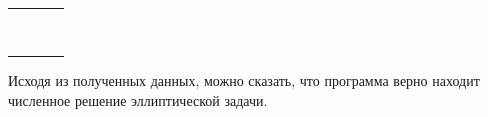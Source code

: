 \begin{table}
\begin{tabularx}{1.0\textwidth}{| >{\raggedright\arraybackslash}X | >{\raggedright\arraybackslash}X | >{\raggedright\arraybackslash}X |>{\raggedright\arraybackslash}X |}
		\centering{($2.0; y; 2.0; 3.0$)} & \centering{1.60000000E+001}& \centering{0.00000000E+000} & \centering{0.00000000E+000} \tabularnewline 
		
		
		
		\centering{($1.0; 1.0; z; 3.0$)} & \centering{1.00000000E+000}& \centering{0.00000000E+000} & \centering{0.00000000E+000} \tabularnewline 
		
		\centering{($2.0; 2.0; z; 3.0$)} & \centering{1.60000000E+001}& \centering{0.00000000E+000} & \centering{0.00000000E+000} \tabularnewline \hline
		
		\centering{($x; 1.0; 1.0; 4.0$)} & \centering{1.00000000E+000}& \centering{0.00000000E+000} & \centering{0.00000000E+000} \tabularnewline 
		
		\centering{($x; 2.0; 2.0; 4.0$)} & \centering{1.60000000E+001}& \centering{0.00000000E+000} & \centering{0.00000000E+000} \tabularnewline 
		
		
		
		\centering{($1.0; y; 1.0; 4.0$)} & \centering{1.00000000E+000}& \centering{0.00000000E+000} & \centering{0.00000000E+000} \tabularnewline 
		
		\centering{($2.0; y; 2.0; 4.0$)} & \centering{1.60000000E+001}& \centering{0.00000000E+000} & \centering{0.00000000E+000} \tabularnewline 
		
		
		
		\centering{($1.0; 1.0; z; 4.0$)} & \centering{1.00000000E+000}& \centering{0.00000000E+000} & \centering{0.00000000E+000} \tabularnewline 
		
		\centering{($2.0; 2.0; z; 4.0$)} & \centering{1.60000000E+001}& \centering{0.00000000E+000} & \centering{0.00000000E+000} \tabularnewline \hline
		
	\end{tabularx}
	\label{tab:test10}
\end{table}

Исходя из полученных данных, можно сказать, что программа верно находит численное решение эллиптической задачи.
